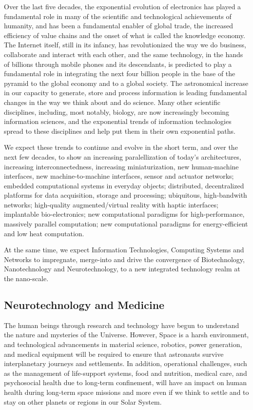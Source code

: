 \documentclass[letter,11pt]{article}
\begin{document}
Over the last five decades, the exponential evolution of electronics has
played a fundamental role in many of the scientific and technological
achievements of humanity, and has been a fundamental enabler of global trade,
the increased efficiency of value chains and the onset of what is called the
knowledge economy. The Internet itself, still in its infancy, has
revolutionized the way we do business, collaborate and interact with each
other, and the same technology, in the hands of billions through mobile phones
and its descendants, is predicted to play a fundamental role in integrating the
next four billion people in the base of the pyramid to the global economy and
to a global society. The astronomical increase in our capacity to generate,
store and process information is leading fundamental changes in the way we
think about and do science. Many other scientific disciplines, including, most
notably, biology, are now increasingly becoming information sciences, and the
exponential trends of information technologies spread to these disciplines and
help put them in their own exponential paths. 

We expect these trends to continue and evolve in the short term, and over the
next few decades, to show an increasing paralellization of today's
architectures, increasing interconnectedness, increasing miniaturization, new
human-machine interfaces, new machine-to-machine interfaces, sensor and
actuator networks; embedded computational systems in everyday objects;
distributed, decentralized platforms for data acquisition, storage and
processing; ubiquitous, high-bandwith networks; high-quality augmented/virtual
reality with haptic interfaces; implantable bio-electronics; new computational
paradigms for high-performance, massively parallel computation; new
computational paradigms for energy-efficient and low heat computation.

At the same time, we expect Information Technologies, Computing Systems and
Networks to impregnate, merge-into and drive the convergence of Biotechnology,
Nanotechnology and Neurotechnology, to a new integrated technology realm at the
nano-scale.


\subsection{Neurotechnology and Medicine}

The human beings through research and technology have begun to understand the
nature and mysteries of the Universe. However, Space is a harsh environment,
and technological advancements in material science, robotics, power generation,
and medical equipment will be required to ensure that astronauts survive
interplanetary journeys and settlements. In addition, operational challenges,
such as the management of life-support systems, food and nutrition, medical
care, and psychosocial health due to long-term confinement, will have an impact
on human health during long-term space missions and more even if we think to
settle and to stay on other planets or regions in our Solar System.
 
\end{document}
